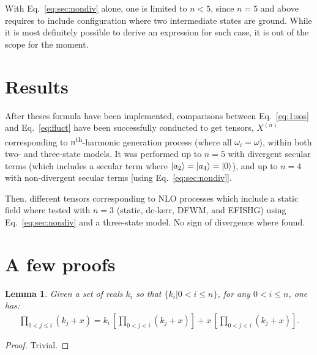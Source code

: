 \documentclass[12pt,a4paper]{article}
\begin{document}
With Eq.~\eqref{eq:sec:nondiv}  alone, one is limited to $n<5$, since $n=5$ and above requires to include configuration where two intermediate states are ground. While it is most definitely possible to derive an expression for such case, it is out of the scope for the moment.

\section{Results}

After theses formula have been implemented, comparisons between Eq.~\eqref{eq:1:sos} and Eq.~\eqref{eq:fluct} have been successfully conducted to get tensors, $X^{(n)}$ corresponding to $n$\textsuperscript{th}-harmonic generation process (where all $\omega_i = \omega$), within both two- and three-state models.
It was performed up to  $n = 5$ with divergent secular terms (which includes a secular term where $\ket{a_2} = \ket{a_4} = \ket{0}$), and up to $n=4$ with non-divergent secular terms [using Eq.~\eqref{eq:sec:nondiv}].

Then, different tensors corresponding to NLO processes which include a static field where tested with $n=3$ (static, dc-kerr, DFWM, and EFISHG) using Eq.~\eqref{eq:sec:nondiv} and a three-state model. No sign of divergence where found.


\clearpage
\appendix
\section{A few proofs}
\setcounter{equation}{0} 
\renewcommand{\theequation}{A\arabic{equation}}

\newtheorem{theorem}{Theorem}[section]
\newtheorem{lemma}[theorem]{Lemma}

\begin{lemma}\label{lem:1}
	Given a set of reals $k_i$ so that $\{k_i|0<i\leq n\}$,  for any $0<i\leq n$, one has:\begin{align}
		\prod_{0<j\leq i} (k_j+x)= k_{i}\,\left[\prod_{0<j<i} (k_j+x) \right] + x\,\left[\prod_{0<j<i} (k_j+x) \right].\label{eq:p1:ind}
	\end{align}
\end{lemma}
\begin{proof}
	Trivial.
\end{proof}
\end{document}
